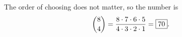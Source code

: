 The order of choosing does not matter, so the number is
\[\dbinom84=\dfrac{8\cdot7\cdot6\cdot5}{4\cdot3\cdot2\cdot1}=\boxed{70}.\]
